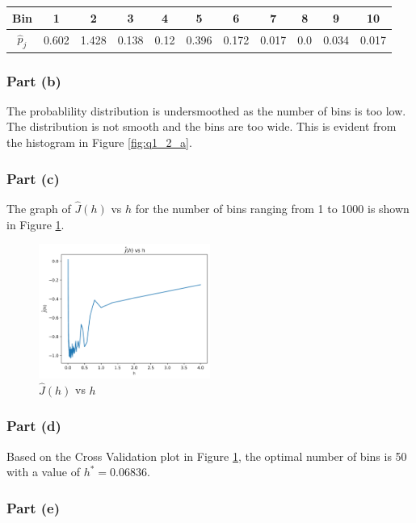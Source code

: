 \begin{tabular}
    { |c|c|c|c|c|c|c|c|c|c|c| }
    \hline
    Bin & 1 & 2 & 3 & 4 & 5 & 6 & 7 & 8 & 9 & 10 \\
    \hline
    $\hat{p}_j$ & 0.602 & 1.428 & 0.138 & 0.12 & 0.396 & 0.172 & 0.017 & 0.0 & 0.034 & 0.017 \\
    \hline
\end{tabular}

\subsubsection{Part (b)}

The probablility distribution is undersmoothed as the number of bins is too low. The distribution is not smooth and the bins are too wide. This is evident from the histogram in Figure \ref{fig:q1_2_a}.

\subsubsection{Part (c)}

The graph of $\hat{J}(h)$ vs $h$ for the number of bins ranging from 1 to 1000 is shown in Figure \ref{fig:q1_2_c}.

\begin{figure}[H]
    \centering
    \includegraphics[width=0.5\textwidth]{../q1/images/crossvalidation.png}
    \caption{$\hat{J}(h)$ vs $h$}
    \label{fig:q1_2_c}
\end{figure}

\subsubsection{Part (d)}

Based on the Cross Validation plot in Figure \ref{fig:q1_2_c}, the optimal number of bins is 50 with a value of $h^\ast = 0.06836$.

\subsubsection{Part (e)}


